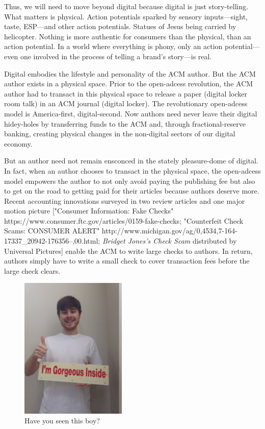 Thus, we will need to move beyond digital because digital is just story-telling. What matters is physical. Action potentials sparked by sensory inputs---sight, taste, ESP---and other action potentials. Statues of Jesus being carried by helicopter. Nothing is more authentic for consumers than the physical, than an action potential. In a world where everything is phony, only an action potential---even one involved in the process of telling a brand's story---is real.

Digital embodies the lifestyle and personality of the ACM author. But the ACM author exists in a physical space. Prior to the open-adcess revolution, the ACM author had to transact in this physical space to release a paper (digital locker room talk) in an ACM journal (digital locker). The revolutionary open-adcess model is America-first, digital-second. Now authors need never leave their digital hidey-holes by transferring funds to the ACM and, through fractional-reserve banking, creating physical changes in the non-digital sectors of our digital economy. 

But an author need not remain ensconced in the stately pleasure-dome of digital. In fact, when an author chooses to transact in the physical space, the open-adcess model empowers the author to not only avoid paying the publishing fee but also to get on the road to getting paid for their articles because authors deserve more. Recent accounting innovations surveyed in two review articles and one major motion picture ["Consumer Information: Fake Checks"
https://www.consumer.ftc.gov/articles/0159-fake-checks; "Counterfeit Check Scams: CONSUMER ALERT" http://www.michigan.gov/ag/0,4534,7-164-17337_20942-176356--,00.html; \textit{Bridget Jones's Check Scam} distributed by Universal Pictures] enable the ACM to write large checks to authors. In return, authors simply have to write a small check to cover transaction fees before the large check clears.

\begin{figure}
\centering
\includegraphics[width=0.45\textwidth]{figures/ad.jpg}
\caption{Have you seen this boy?}
\end{figure}
